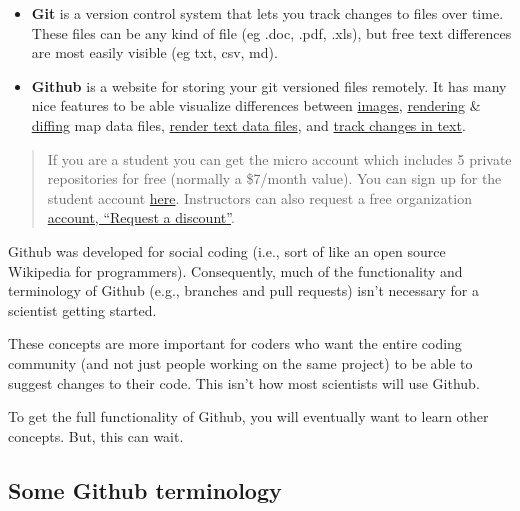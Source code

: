 \documentclass[]{book}
\theoremstyle{definition}
\theoremstyle{definition}
\theoremstyle{definition}
\theoremstyle{remark}
\begin{document}
\begin{itemize}
\item
  \textbf{Git} is a version control system that lets you track changes
  to files over time. These files can be any kind of file (eg .doc,
  .pdf, .xls), but free text differences are most easily visible (eg
  txt, csv, md).
\item
  \textbf{Github} is a website for storing your git versioned files
  remotely. It has many nice features to be able visualize differences
  between
  \href{https://help.github.com/articles/rendering-and-diffing-images/}{images},
  \href{https://help.github.com/articles/mapping-geojson-files-on-github/}{rendering}
  \&
  \href{https://github.com/blog/1772-diffable-more-customizable-maps}{diffing}
  map data files,
  \href{https://help.github.com/articles/rendering-csv-and-tsv-data/}{render
  text data files}, and
  \href{https://help.github.com/articles/rendering-differences-in-prose-documents/}{track
  changes in text}.
\end{itemize}

\begin{quote}
If you are a student you can get the micro account which includes 5
private repositories for free (normally a \$7/month value). You can sign
up for the student account
\href{https://education.github.com/pack}{here}. Instructors can also
request a free organization
\href{https://education.github.com/}{account, ``Request a discount''}.
\end{quote}

Github was developed for social coding (i.e., sort of like an open
source Wikipedia for programmers). Consequently, much of the
functionality and terminology of Github (e.g., branches and pull
requests) isn't necessary for a scientist getting started.

These concepts are more important for coders who want the entire coding
community (and not just people working on the same project) to be able
to suggest changes to their code. This isn't how most scientists will
use Github.

To get the full functionality of Github, you will eventually want to
learn other concepts. But, this can wait.

\subsection{Some Github terminology}\label{some-github-terminology}
\end{document}
